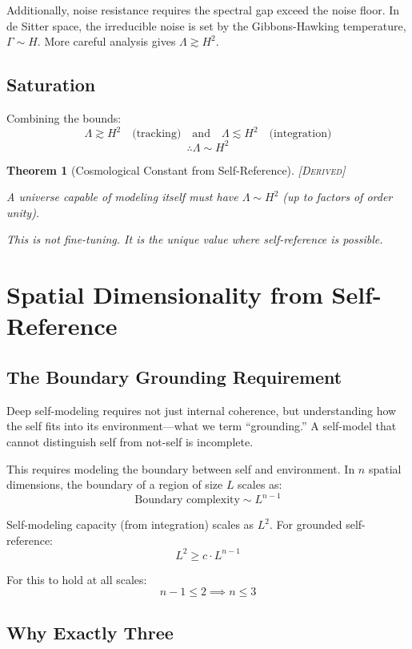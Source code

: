 \documentclass[11pt,a4paper]{article}
\newtheorem{theorem}{Theorem}[section]
\theoremstyle{definition}
\theoremstyle{remark}
\begin{document}
Additionally, noise resistance requires the spectral gap exceed the noise floor. In de Sitter space, the irreducible noise is set by the Gibbons-Hawking temperature, $\Gamma \sim H$. More careful analysis gives $\Lambda \gtrsim H^2$.

\subsection{Saturation}

Combining the bounds:
\[
\Lambda \gtrsim H^2 \quad \text{(tracking)} \quad \text{and} \quad \Lambda \lesssim H^2 \quad \text{(integration)}
\]
\[
\therefore \Lambda \sim H^2
\]

\begin{theorem}[Cosmological Constant from Self-Reference]
\textsc{[Derived]}

A universe capable of modeling itself must have $\Lambda \sim H^2$ (up to factors of order unity).

This is not fine-tuning. It is the unique value where self-reference is possible.
\end{theorem}

\section{Spatial Dimensionality from Self-Reference}

\subsection{The Boundary Grounding Requirement}

Deep self-modeling requires not just internal coherence, but understanding how the self fits into its environment---what we term ``grounding.'' A self-model that cannot distinguish self from not-self is incomplete.

This requires modeling the boundary between self and environment. In $n$ spatial dimensions, the boundary of a region of size $L$ scales as:
\[
\text{Boundary complexity} \sim L^{n-1}
\]

Self-modeling capacity (from integration) scales as $L^2$. For grounded self-reference:
\[
L^2 \geq c \cdot L^{n-1}
\]

For this to hold at all scales:
\[
n - 1 \leq 2 \implies n \leq 3
\]

\subsection{Why Exactly Three}
\end{document}
